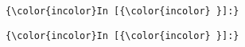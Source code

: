 \documentclass[11pt]{article}
\begin{document}
    \begin{Verbatim}[commandchars=\\\{\}]
{\color{incolor}In [{\color{incolor} }]:} 
\end{Verbatim}

    \begin{Verbatim}[commandchars=\\\{\}]
{\color{incolor}In [{\color{incolor} }]:} 
\end{Verbatim}


    
    
    
    
\end{document}
